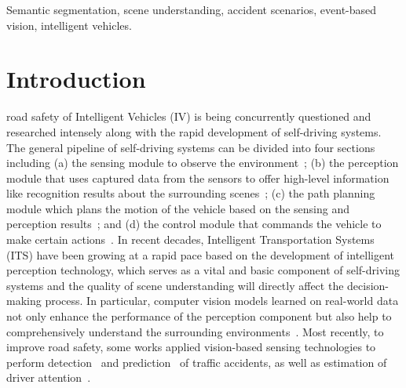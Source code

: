 \documentclass[journal]{IEEEtran}
\begin{document}
\begin{IEEEkeywords}
Semantic segmentation, scene understanding, accident scenarios, event-based vision, intelligent vehicles.
\end{IEEEkeywords}

\IEEEpeerreviewmaketitle



\section{Introduction}
 road safety of Intelligent Vehicles (IV) is being concurrently questioned and researched intensely along with the rapid development of self-driving systems.
The general pipeline of self-driving systems can be divided into four sections including (a) the sensing module to observe the environment~\cite{sun2019multimodal}; (b) the perception module that uses captured data from the sensors to offer high-level information like recognition results about the surrounding scenes~\cite{muresan2020stabilization}; (c) the path planning module which plans the motion of the vehicle based on the sensing and perception results~\cite{kim2017intervention}; and (d) the control module that commands the vehicle to make certain actions~\cite{arikan2018control}.
In recent decades, Intelligent Transportation Systems (ITS) have been growing at a rapid pace based on the development of intelligent perception technology, which serves as a vital and basic component of self-driving systems and the quality of scene understanding will directly affect the decision-making process. 
In particular, computer vision models learned on real-world data not only enhance the performance of the perception component but also help to comprehensively understand the surrounding environments~\cite{cordts2016cityscapes}. Most recently, to improve road safety, some works applied vision-based sensing technologies to perform detection~\cite{le2020attention_accidentdetection}\cite{pashaei2020accident_classify}\cite{you2020traffic_accident_benchmark} and prediction~\cite{yuan2018accident_prediction} of traffic accidents, as well as estimation of driver attention~\cite{FangDADA}.
\end{document}
